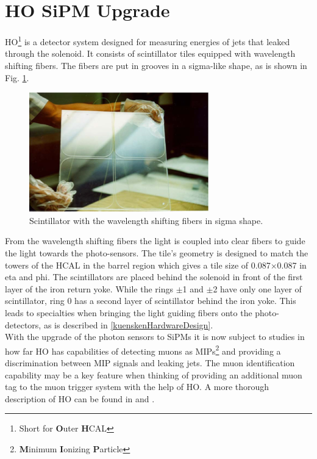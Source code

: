 \section{HO SiPM Upgrade}
HO\footnote{Short for {\bf O}uter {\bf H}CAL} is a detector system designed for measuring energies of jets that leaked through the solenoid. It consists of scintillator tiles equipped with wavelength shifting fibers. The fibers are put in grooves in a sigma-like shape, as is shown in Fig. \ref{kuenskenScintWithFiber}.
\begin{figure}[h]
\centering
\begin{minipage}[t]{0.475\textwidth}
\includegraphics[width=\textwidth]{Figures/kuensken/hoTile.png}
\caption{Scintillator with the wavelength shifting fibers in sigma shape.}
\label{kuenskenScintWithFiber}
\end{minipage}
\hspace{1cm}
\begin{minipage}[t]{0.435\textwidth}

\end{minipage}
\end{figure}
From the wavelength shifting fibers the light is coupled into clear fibers to guide the light towards the photo-sensors. The tile's geometry is designed to match the towers of the HCAL in the barrel region which gives a tile size of 0.087$\times$0.087 in eta and phi. The scintillators are placed behind the solenoid in front of the first layer of the iron return yoke. While the rings $\pm$1 and $\pm$2 have only one layer of scintillator, ring 0 has a second layer of scintillator behind the iron yoke. This leads to specialties when bringing the light guiding fibers onto the photo-detectors, as is described in \ref{kuenskenHardwareDesign}.\\
With the upgrade of the photon sensors to SiPMs it is now subject to studies in how far HO has capabilities of detecting muons as MIPs\footnote{{\bf M}inimum {\bf I}onizing {\bf P}article} and providing a discrimination between MIP signals and leaking jets. The muon identification capability may be a key feature when thinking of providing an additional muon tag to the muon trigger system with the help of HO. A more thorough description of HO can be found in \cite{hcalTDR} and \cite{hoDesign}.
